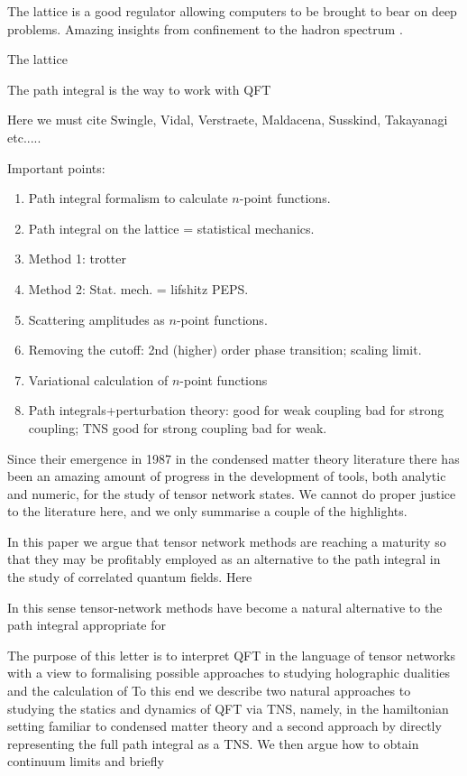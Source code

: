 \documentclass[prl,twocolumn,lengthcheck,superscriptaddress]{revtex4-1}
\theoremstyle{definition}
\theoremstyle{remark}
\begin{document}
The lattice is a good regulator allowing computers to be brought to bear on deep problems. Amazing insights
\cite{wilson:1974b} from confinement to the hadron spectrum \cite{duerr:2008a}.

The lattice 



The path integral is the way to work with QFT


\cite{horava:2008a}\cite{ardonne:2004a}\cite{horava:2009a}\cite{swingle:2012a}\cite{aharonov:2003a}\cite{rudolph:2002a}\cite{ryu:2006a}\cite{ryu:2006b}\cite{nishioka:2009a}\cite{maldacena:2013a}\cite{hartman:2013a}


Here we must cite Swingle, Vidal, Verstraete, Maldacena, Susskind, Takayanagi etc.....

Important points:
\begin{enumerate}
	\item Path integral formalism to calculate $n$-point functions.
	\item Path integral on the lattice = statistical mechanics.
	\item Method 1: trotter
	\item Method 2: Stat. mech. = lifshitz PEPS.
	\item Scattering amplitudes as $n$-point functions.
	\item Removing the cutoff: 2nd (higher) order phase transition; scaling limit.
	\item Variational calculation of $n$-point functions 
	\item Path integrals+perturbation theory: good for weak coupling bad for strong coupling; TNS good for strong coupling bad for weak.
\end{enumerate}


Since their emergence in 1987 in the condensed matter theory literature there has been an amazing amount of progress in the development of tools, both analytic and numeric, for the study of tensor network states. We cannot do proper justice to the literature here, and we only summarise a couple of the highlights. 

In this paper we argue that tensor network methods are reaching a maturity so that they may be profitably employed as an alternative to the path integral in the study of correlated quantum fields. Here  

In this sense tensor-network methods have become a natural alternative to the path integral appropriate for 

The purpose of this letter is to interpret QFT in the language of tensor networks with a view to formalising possible approaches to studying holographic dualities and the calculation of  To this end we describe two natural approaches to studying the statics and dynamics of QFT via TNS, namely, in the hamiltonian setting familiar to condensed matter theory and a second approach by directly representing the full path integral as a TNS. We then argue how to obtain continuum limits and briefly 
\end{document}
